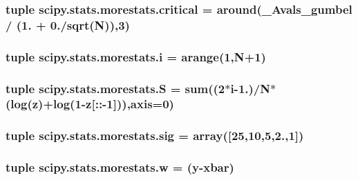 \subsubsection[{critical}]{\setlength{\rightskip}{0pt plus 5cm}tuple scipy.\+stats.\+morestats.\+critical = around({\bf \+\_\+\+Avals\+\_\+gumbel} / (1. + 0./{\bf sqrt}({\bf N})),3)}\label{namespacescipy_1_1stats_1_1morestats_ad38f5eb205317368cf1cae4038cc91fc}
\hypertarget{namespacescipy_1_1stats_1_1morestats_a6002aaa13e15af7a34f1c7a0c4f908e0}{}
\subsubsection[{i}]{\setlength{\rightskip}{0pt plus 5cm}tuple scipy.\+stats.\+morestats.\+i = arange(1,{\bf N}+1)}\label{namespacescipy_1_1stats_1_1morestats_a6002aaa13e15af7a34f1c7a0c4f908e0}
\hypertarget{namespacescipy_1_1stats_1_1morestats_a9cb5458d19a10bb8b8bb0fc6c54aaef9}{}
\subsubsection[{S}]{\setlength{\rightskip}{0pt plus 5cm}tuple scipy.\+stats.\+morestats.\+S = {\bf sum}((2$\ast${\bf i}-\/1.)/{\bf N}$\ast$({\bf log}({\bf z})+{\bf log}(1-\/{\bf z}\mbox{[}\+::-\/1\mbox{]})),axis=0)}\label{namespacescipy_1_1stats_1_1morestats_a9cb5458d19a10bb8b8bb0fc6c54aaef9}
\hypertarget{namespacescipy_1_1stats_1_1morestats_a9ec3d2a6dfa45c81743753af5649bb75}{}
\subsubsection[{sig}]{\setlength{\rightskip}{0pt plus 5cm}tuple scipy.\+stats.\+morestats.\+sig = array(\mbox{[}25,10,5,2.,1\mbox{]})}\label{namespacescipy_1_1stats_1_1morestats_a9ec3d2a6dfa45c81743753af5649bb75}
\hypertarget{namespacescipy_1_1stats_1_1morestats_a1ae693e1a4d206618c7a9de42f70e2ca}{}
\subsubsection[{w}]{\setlength{\rightskip}{0pt plus 5cm}tuple scipy.\+stats.\+morestats.\+w = (y-\/xbar)}\label{namespacescipy_1_1stats_1_1morestats_a1ae693e1a4d206618c7a9de42f70e2ca}



